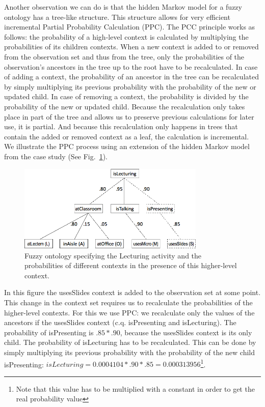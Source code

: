 \documentclass[journal]{vgtc}                %
\begin{document}
Another observation we can do is that the hidden Markov model for a fuzzy ontology has a tree-like structure. This structure allows for very efficient incremental Partial Probability Calculation (PPC). The PCC principle works as follows: the probability of a high-level context is calculated by multiplying the probabilities of its children contexts. When a new context is added to or removed from the observation set and thus from the tree, only the probabilities of the observation's ancestors in the tree up to the root have to be recalculated. In case of adding a context, the probability of an ancestor in the tree can be recalculated by simply multiplying its previous probability with the probability of the new or updated child. In case of removing a context, the probability is divided by the probability of the new or updated child. Because the recalculation only takes place in part of the tree and allows us to preserve previous calculations for later use, it is partial. And because this recalculation only happens in trees that contain the added or removed context as a leaf, the calculation is incremental. We illustrate the PPC process using an extension of the hidden Markov model from the case study (See Fig.~\ref{fig:fuzzy2}). 
\begin{figure}[htb]
  \centering
  \includegraphics[width=3.5in]{fuzzy2}
  \caption{Fuzzy ontology specifying the Lecturing activity and the probabilities of different contexts in the presence of this higher-level context.}
  \label{fig:fuzzy2}
\end{figure}
In this figure the usesSlides context is added to the observation set at some point. This change in the context set requires us to recalculate the probabilities of the higher-level contexts. For this we use PPC: we recalculate only the values of the ancestors if the usesSlides context (c.q. isPresenting and isLecturing). The probability of isPresenting is $.85 * .90$, because the usesSlides context is its only child. The probability of isLecturing has to be recalculated. This can be done by simply multiplying its previous probability with the probability of the new child isPresenting: $isLecturing = 0.0004104 * .90 * .85 = 0.000313956$\footnote{Note that this value has to be multiplied with a constant in order to get the real probability value}.
\end{document}

